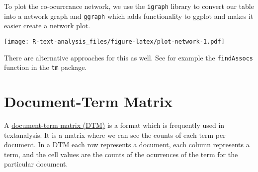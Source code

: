 \documentclass[]{book}
\newenvironment{Shaded}{\begin{snugshade}}{\end{snugshade}}
\newcommand{\CommentTok}[1]{\textcolor[rgb]{0.56,0.35,0.01}{\textit{#1}}}
\newcommand{\DataTypeTok}[1]{\textcolor[rgb]{0.13,0.29,0.53}{#1}}
\newcommand{\DecValTok}[1]{\textcolor[rgb]{0.00,0.00,0.81}{#1}}
\newcommand{\FloatTok}[1]{\textcolor[rgb]{0.00,0.00,0.81}{#1}}
\newcommand{\KeywordTok}[1]{\textcolor[rgb]{0.13,0.29,0.53}{\textbf{#1}}}
\newcommand{\NormalTok}[1]{#1}
\newcommand{\OperatorTok}[1]{\textcolor[rgb]{0.81,0.36,0.00}{\textbf{#1}}}
\newcommand{\OtherTok}[1]{\textcolor[rgb]{0.56,0.35,0.01}{#1}}
\newcommand{\StringTok}[1]{\textcolor[rgb]{0.31,0.60,0.02}{#1}}
\begin{document}
To plot the co-ocurrcance network, we use the \texttt{igraph} library to convert our table into a network graph and \texttt{ggraph} which adds functionality to ggplot and makes it easier create a network plot.

\begin{Shaded}
\end{Shaded}

\texttt{[image: R-text-analysis\_files/figure-latex/plot-network-1.pdf]}

There are alternative approaches for this as well. See for example the \texttt{findAssocs} function in the \texttt{tm} package.

\hypertarget{document-term-matrix}{%
\section{Document-Term Matrix}\label{document-term-matrix}}

A \href{https://en.wikipedia.org/wiki/Document-term_matrix}{document-term matrix (DTM)} is a format which is frequently used in textanalysis. It is a matrix where we can see the counts of each term per document. In a DTM each row represents a document, each column represents a term, and the cell values are the counts of the ocurrences of the term for the particular document.
\end{document}
